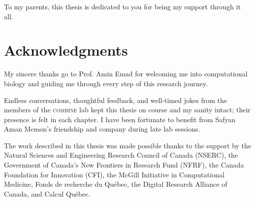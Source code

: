 \hspace{0pt}

\vspace*{\fill}
\begin{center}
To my parents, this thesis is dedicated to you for being my support through it all.
\end{center}
\vspace*{\fill}
\hspace{0pt}

\chapter*{Acknowledgments}

My sincere thanks go to Prof. Amin Emad for welcoming me into computational biology and guiding me through every step of this research journey.

Endless conversations, thoughtful feedback, and well-timed jokes from the members of the \textsc{combine} lab  kept this thesis on course and my sanity intact; their presence is felt in each chapter. I have been fortunate to benefit from Safyan Aman Memon’s friendship and company during late lab sessions.

The work described in this thesis was made possible thanks to the support by the Natural Sciences and Engineering Research Council of Canada (NSERC), the Government of Canada’s New Frontiers in Research Fund (NFRF), the Canada Foundation for Innovation (CFI), the McGill Initiative in Computational Medicine, Fonds de recherche du Québec, the Digital Research Alliance of Canada, and Calcul Québec.
